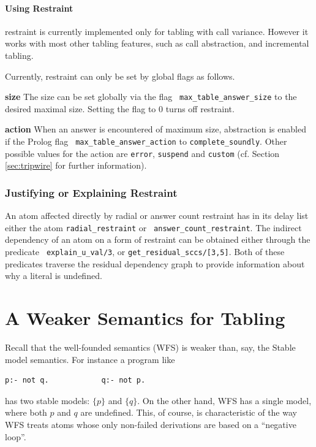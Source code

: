 \paragraph*{Using \MAXANS{} Restraint}
\Maxans{} restraint is currently implemented only for tabling with call
variance.  However it works with most other tabling features, such as
call abstraction, and incremental tabling.

Currently, \maxans{} restraint can only be set by global flags as
follows.
\bi
\item {\bf size} The size can be set globally via the flag {\tt
  max\_table\_answer\_size} to the desired maximal size.  Setting the
  flag to 0 turns off \maxans{} restraint.

\item {\bf action} When an answer is encountered of maximum size,
  abstraction is enabled if the Prolog flag {\tt
    max\_table\_answer\_action} to {\tt complete\_soundly}.  Other
  possible values for the action are {\tt error}, {\tt suspend} and {\tt custom}
  (cf. Section \ref{sec:tripwire} for further information).  \ei

\subsubsection{Justifying or Explaining Restraint}

An atom affected directly by radial or answer count restraint has in
its delay list either the atom {\tt radial\_restraint} or {\tt
  answer\_count\_restraint}.  The indirect dependency of an atom on a
form of restraint can be obtained either through the predicate {\tt
  explain\_u\_val/3}, or {\tt get\_residual\_sccs/[3,5]}.  Both of
these predicates traverse the residual dependency graph to provide
information about why a literal is undefined.




\section{A Weaker Semantics for Tabling}
%
Recall that the well-founded semantics (WFS) is weaker than, say,
the Stable model semantics.  For instance a program like
%
\begin{verbatim}
p:- not q.            q:- not p.
\end{verbatim}
%
has two stable models: $\{p\}$ and $\{q\}$.  On the other hand, WFS
has a single model, where both $p$ and $q$ are undefined.  This, of
course, is characteristic of the way WFS treats atoms whose only
non-failed derivations are based on a ``negative loop''.

